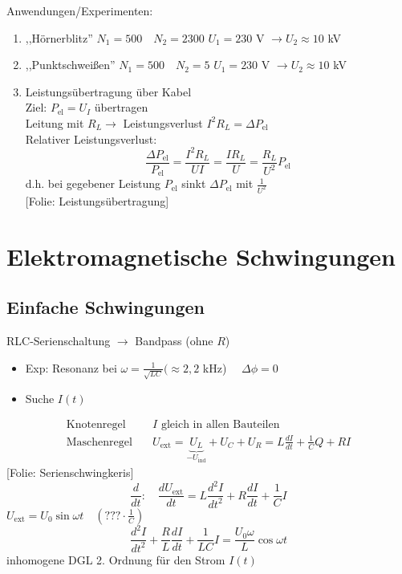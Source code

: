 \documentclass[titlepage,12pt,a4paper,ngerman]{report}
\newcommand{\tx}[1]{\textrm{#1}}
\newcommand{\uind}{U_{\tx{ind}}}
\newcommand{\folie}[1]{\color{gray}[Folie: #1]\color{black}}
\begin{document}
Anwendungen/Experimenten:
\begin{enumerate}[1.]
	\item ,,Hörnerblitz'' $N_1 = 500 \quad N_2 = 2300$
	$U_1 = 230$ V $\rightarrow U_2 \approx 10$ kV
	\item ,,Punktschweißen''  $N_1 = 500 \quad N_2 = 5$
	$U_1 = 230$ V $\rightarrow U_2 \approx 10$ kV
	\item Leistungsübertragung über Kabel\\
		Ziel: $P_{\tx{el}} = U_I$ übertragen\\
		Leitung mit $R_L \rightarrow$ Leistungsverlust $I^2 R_L = \Delta P_{\tx{el}}$\\
		Relativer Leistungsverlust:
		$$\frac{\Delta P_{\tx{el}}}{P_{\tx{el}}} = \frac{I^2 R_L}{UI} = \frac{IR_L}{U}= \frac{R_L}{U^2} P_{\tx{el}}$$
		d.h. bei gegebener Leistung $P_{\tx{el}}$ sinkt $\Delta P_{\tx{el}}$ mit $\frac{1}{U^2}$\\
		\folie{Leistungsübertragung}\\

\end{enumerate}

\section{Elektromagnetische Schwingungen}
\subsection{Einfache Schwingungen}
RLC-Serienschaltung $\rightarrow$ Bandpass (ohne $R$)
\begin{itemize}
	\item Exp: Resonanz bei $\omega = \frac{1}{\sqrt{LC}} (\approx 2,2$ kHz) $\quad \Delta\phi = 0$
	\item Suche $I(t)$
\end{itemize}
\begin{align*}
 	\tx{Knotenregel}& \quad I \tx{ gleich in allen Bauteilen}\\
 	\tx{Maschenregel}& \quad U_{\tx{ext}} = \underbrace{U_L}_{-\uind} + U_C + U_R = L \frac{dI}{dt}+ \frac{1}{C}Q + R I
\end{align*}
\folie{Serienschwingkeris}
$$ \frac{d}{dt}: \quad \frac{d U_{\tx{ext}}}{dt} = L \frac{d^2 I}{dt^2} + R \frac{dI}{dt} + \frac{1}{C} I $$
$ U_{\tx{ext}} = U_0 \sin \omega t\quad  (??? \cdot \frac{1}{C}) $
$$\frac{d^2 I}{dt^2} + \frac{R}{L} \frac{dI}{dt} + \frac{1}{LC} I = \frac{U_0 \omega}{L} \cos \omega t $$
inhomogene DGL 2. Ordnung für den Strom $ I(t) $
\end{document}
